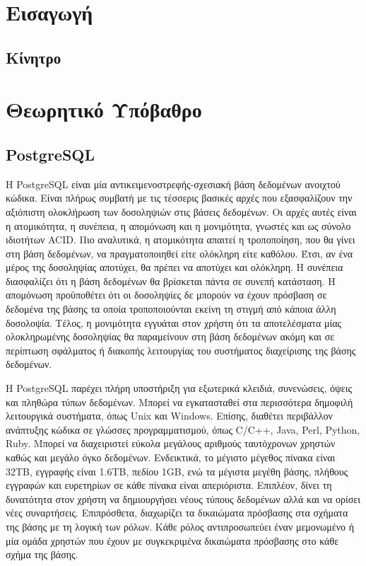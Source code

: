 \documentclass[diploma]{softlab-thesis}
\begin{document}

\tableofcontents


\mainmatter

\chapter{Εισαγωγή}

\section{Κίνητρο}


\chapter{Θεωρητικό Υπόβαθρο}

\section{PostgreSQL}

Η PostgreSQL είναι μία αντικειμενοστρεφής-σχεσιακή βάση δεδομένων ανοιχτού κώδικα. Είναι πλήρως συμβατή με τις τέσσερις βασικές αρχές που εξασφαλίζουν 
την αξιόπιστη ολοκλήρωση των δοσοληψιών στις βάσεις δεδομένων. Οι αρχές αυτές είναι η ατομικότητα, η συνέπεια, η απομόνωση και η μονιμότητα, γνωστές και ως σύνολο 
ιδιοτήτων ACID. Πιο αναλυτικά, η ατομικότητα απαιτεί η τροποποίηση, που θα γίνει στη βάση δεδομένων, να πραγματοποιηθεί είτε ολόκληρη είτε καθόλου. 
Έτσι, αν ένα μέρος της δοσοληψίας αποτύχει, θα πρέπει να αποτύχει και ολόκληρη. Η συνέπεια διασφαλίζει ότι η βάση δεδομένων θα βρίσκεται πάντα σε συνεπή κατάσταση. 
Η απομόνωση προϋποθέτει ότι οι δοσοληψίες δε μπορούν να έχουν πρόσβαση σε δεδομένα της βάσης τα οποία τροποποιούνται εκείνη τη στιγμή από κάποια άλλη δοσολοψία. 
Τέλος, η μονιμότητα εγγυάται στον χρήστη ότι τα αποτελέσματα μίας ολοκληρωμένης δοσοληψίας θα παραμείνουν στη βάση δεδομένων ακόμη και σε περίπτωση σφάλματος ή 
διακοπής λειτουργίας του συστήματος διαχείρισης της βάσης δεδομένων. 

Η PostgreSQL παρέχει πλήρη υποστήριξη για εξωτερικά κλειδιά, συνενώσεις, όψεις και πληθώρα τύπων δεδομένων. Μπορεί να εγκατασταθεί στα περισσότερα δημοφιλή 
λειτουργικά συστήματα, όπως Unix και Windows. Επίσης, διαθέτει περιβάλλον ανάπτυξης κώδικα σε γλώσσες προγραμματισμού, όπως C/C++, Java, Perl, Python, Ruby. 
Μπορεί να διαχειριστεί εύκολα μεγάλους αριθμούς ταυτόχρονων χρηστών καθώς και μεγάλο όγκο δεδομένων. Ενδεικτικά, το μέγιστο μέγεθος πίνακα είναι 32ΤΒ, 
εγγραφής είναι 1.6ΤΒ, πεδίου 1GB, ενώ τα μέγιστα μεγέθη βάσης, πλήθους εγγραφών και ευρετηρίων σε κάθε πίνακα είναι απεριόριστα. Επιπλέον, δίνει τη δυνατότητα στον 
χρήστη να δημιουργήσει νέους τύπους δεδομένων αλλά και να ορίσει νέες συναρτήσεις. Επιπρόσθετα, διαχωρίζει τα δικαιώματα πρόσβασης στα σχήματα της βάσης με τη λογική 
των ρόλων. Κάθε ρόλος αντιπροσωπεύει έναν μεμονωμένο ή μία ομάδα χρηστών που έχουν με συγκεκριμένα δικαιώματα πρόσβασης στο κάθε σχήμα της βάσης. 
\end{document}
